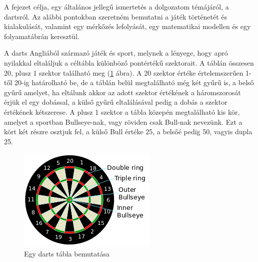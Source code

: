 
A fejezet célja, egy általános jellegű ismertetés a dolgozatom témájáról, a dartsról. Az alábbi pontokban szeretném bemutatni a játék történetét és kialakulását, valamint egy mérkőzés lefolyását, egy matematikai modellen és egy folyamatábrán keresztül.


A darts Angliából származó játék és sport, melynek a lényege, hogy apró nyilakkal eltaláljuk a céltábla különböző pontértékű szektorait. A táblán összesen 20, plusz 1 szektor található meg (\ref{fig:dartboard} ábra). A 20 szektor értéke értelemszerűen 1-től 20-ig határolható be, de a táblán belül megtalálható még két gyűrű is, a belső gyűrű amelyet, ha eltálunk akkor az adott szektor értékének a háromszorosát érjük el egy dobással, a külső gyűrű eltalálásával pedig a dobás a szektor értékének kétszerese. A plusz 1 szektor a tábla közepén megtalálható kis kör, amelyet a sportban Bullseye-nak, vagy röviden csak Bull-nak nevezünk. Ezt a kört két részre osztjuk fel, a külső Bull értéke 25, a belsőé pedig 50, vagyis dupla 25. \cite{Darts1}

\begin{figure}[h]
\centering
\includegraphics[scale=0.9]{images/Dartboard}
\caption{Egy darts tábla bemutatása}
\label{fig:dartboard}
\end{figure}
 
